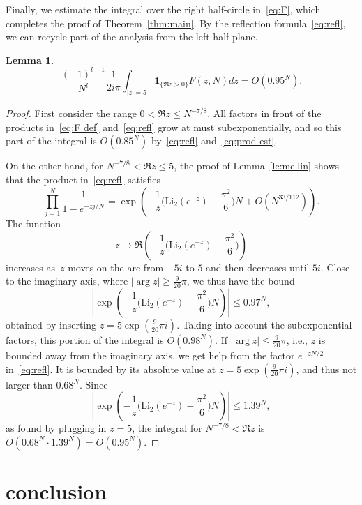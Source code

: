 \documentclass[a4paper]{amsart}
\newtheorem{lemma}[theorem]{Lemma}
\begin{document}
Finally, we estimate the integral over the right half-circle in~\eqref{eq:F},
which completes the proof of Theorem~\ref{thm:main}.
By the reflection formula~\eqref{eq:refl}, we can recycle part of the
analysis from the left half-plane.

\begin{lemma}
  \[
   \frac{(-1)^{l-1}}{N^l} \frac{1}{2i\pi} \int_{|z|=5}
     \mathbf{1}_{\{\Re z>0\}} F(z,N) dz = O(0.95^N).
  \]
\end{lemma}
\begin{proof}
  First consider the range $0< \Re z \leq N^{-7/8}$. All factors
  in front of the products in~\eqref{eq:F def} and~\eqref{eq:refl}
  grow at must subexponentially, and so this part of the integral
  is $O(0.85^N)$ by~\eqref{eq:refl} and~\eqref{eq:prod est}.
  
  On the other hand, for $N^{-7/8}< \Re z \leq 5$, the proof
  of Lemma~\ref{le:mellin} shows that the product in~\eqref{eq:refl}
  satisfies
  \[
    \prod_{j=1}^N \frac{1}{1-e^{-zj/N}} = \exp\left(
    -\frac{1}{z}\Big( \mathrm{Li}_2(e^{-z}) - \frac{\pi^2}{6}\Big)N
    +O(N^{33/112}) \right).
  \]
  The function
  \[
    z \mapsto \Re\left(-\frac{1}{z}
      \Big( \mathrm{Li}_2(e^{-z}) - \frac{\pi^2}{6}\Big) \right)
  \]
  increases as~$z$ moves on the arc from $-5i$ to $5$ and then
  decreases until $5i$. Close to the imaginary axis, where
  $|\arg z|\geq \tfrac{9}{20}\pi$, we thus
  have the bound
  \[
    \left|\exp\left(
    -\frac{1}{z}\Big( \mathrm{Li}_2(e^{-z}) - \frac{\pi^2}{6}\Big)N \right) \right|
    \leq 0.97^N,
  \]
  obtained by inserting $z=5\exp(\tfrac{9}{20}\pi i)$. Taking into account
  the subexponential factors, this portion of the integral
  is $O(0.98^N)$. If $|\arg z|\leq \tfrac{9}{20}\pi$, i.e., $z$ is bounded away
  from the imaginary axis, we get help from the factor $e^{-zN/2}$
  in~\eqref{eq:refl}. It is bounded by its absolute value
  at $z=5\exp(\tfrac{9}{20}\pi i)$, and thus not larger than $0.68^N$.
  Since
  \[
    \left|\exp\left(
    -\frac{1}{z}\Big( \mathrm{Li}_2(e^{-z}) - \frac{\pi^2}{6}\Big)N \right) \right|
    \leq 1.39^N,
  \]
  as found by plugging in $z=5$, the integral for $N^{-7/8}< \Re z$
  is $O(0.68^N \cdot 1.39^N)=O(0.95^N)$.
\end{proof}

\section{conclusion}
\end{document}
